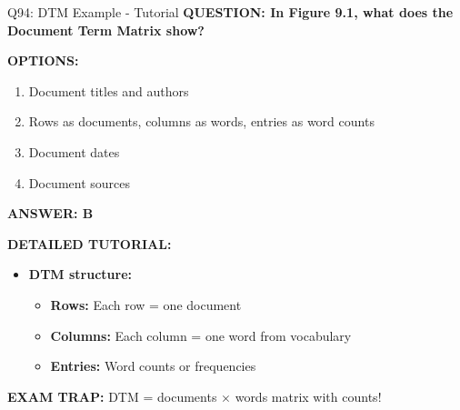 \documentclass[8pt]{beamer}
\begin{document}
	\begin{frame}{Q94: DTM Example - Tutorial}
		\fontsize{6.5}{7.5}\selectfont
		\textbf{QUESTION: In Figure 9.1, what does the Document Term Matrix show?}
		
		\vspace{0.1cm}
		\textbf{OPTIONS:}
		\begin{enumerate}
			\item Document titles and authors
			\item Rows as documents, columns as words, entries as word counts
			\item Document dates
			\item Document sources
		\end{enumerate}
		
		\vspace{0.1cm}
		\textcolor{myblue}{\textbf{ANSWER: B}}
		
		\vspace{0.1cm}
		\textbf{DETAILED TUTORIAL:}
		\begin{itemize}
			\item \textbf{DTM structure:}
			\begin{itemize}
				\item \textbf{Rows:} Each row = one document
				\item \textbf{Columns:} Each column = one word from vocabulary
				\item \textbf{Entries:} Word counts or frequencies
			\end{itemize}
		\end{itemize}
		
		\textcolor{myred}{\textbf{EXAM TRAP:}} DTM = \textcolor{myblue}{documents $\times$ words matrix with counts}!
	\end{frame}
	
\end{document}

